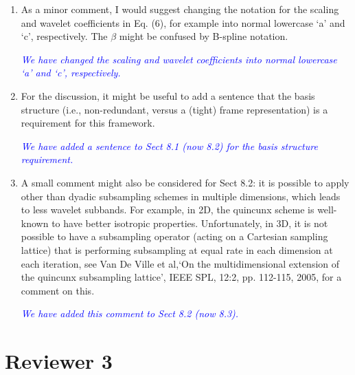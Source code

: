 \documentclass{article}
\newcommand{\parham}[1]{\textcolor{blue}{#1}}
\begin{document}
\begin{enumerate}
    \item As a minor comment, I would suggest changing the notation for the scaling and wavelet coefficients in Eq. (6), for example into normal lowercase `a' and `c', respectively. The $\beta$ might be confused by B-spline notation. 

	\emph{\parham{We have changed the scaling and wavelet coefficients into normal lowercase `a' and `c', respectively.}}

\item For the discussion, it might be useful to add a sentence that the basis structure (i.e., non-redundant, versus a (tight) frame representation) is a requirement for this framework.

\emph{\parham{We have added a sentence to Sect 8.1 (now 8.2) for the basis structure requirement.}}



\item A small comment might also be considered for Sect 8.2: it is possible to apply other than dyadic subsampling schemes in multiple dimensions, which leads to less wavelet subbands. For example, in 2D, the quincunx scheme is well-known to have better isotropic properties. Unfortunately, in 3D, it is not possible to have a subsampling operator (acting on a Cartesian sampling lattice) that is performing subsampling at equal rate in each dimension at each iteration, see Van De Ville et al,`On the multidimensional extension of the quincunx subsampling lattice', IEEE SPL, 12:2, pp.  112-115, 2005, for a comment on this. 

\emph{\parham{We have added this comment to Sect 8.2 (now 8.3).}}



 

\end{enumerate}  

    \section{Reviewer 3}  
\end{document}
